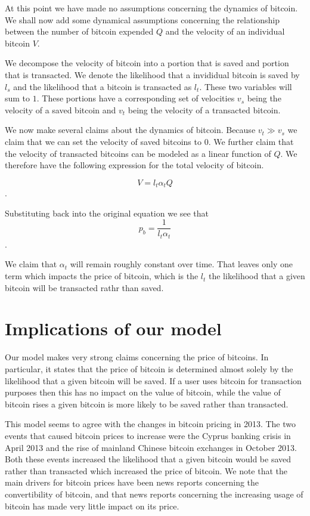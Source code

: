 \documentclass[twoside]{article}
\begin{document}
\begin{multicols}{2}
At this point we have made no assumptions concerning the dynamics of
bitcoin.  We shall now add some dynamical assumptions concerning the
relationship between the number of bitcoin expended $Q$ and the
velocity of an individual bitcoin $V$.

We decompose the velocity of bitcoin into a portion that is saved and
portion that is transacted.  We denote the likelihood that a
invididual bitcoin is saved by $l_s$ and the likelihood that a bitcoin
is transacted as $l_t$.  These two variables will sum to $1$.  These
portions have a corresponding set of velocities $v_s$ being the
velocity of a saved bitcoin and $v_t$ being the velocity of a
transacted bitcoin.

We now make several claims about the dynamics of bitcoin.  Because
$v_t \gg v_s$ we claim that we can set the velocity of saved bitcoins
to $0$.  We further claim that the velocity of transacted bitcoins can
be modeled as a linear function of $Q$.  We therefore have the
following expression for the total velocity of bitcoin.

\begin{equation}
V = l_t\alpha_t Q
\end{equation}.

Substituting back into the original equation we see that
\begin{equation}
p_b = \frac{1}{l_t \alpha_t}
\end{equation}.

We claim that $\alpha_t$ will remain roughly constant over time.  That
leaves only one term which impacts the price of bitcoin, which is the
$l_t$ the likelihood that a given bitcoin will be transacted rathr
than saved.

\section{Implications of our model}
Our model makes very strong claims concerning the price of bitcoins.
In particular, it states that the price of bitcoin is determined
almost solely by the likelihood that a given bitcoin will be saved. If
a user uses bitcoin for transaction purposes then this has no impact
on the value of bitcoin, while the value of bitcoin rises a given
bitcoin is more likely to be saved rather than transacted.

This model seems to agree with the changes in bitcoin pricing in 2013.
The two events that caused bitcoin prices to increase were the Cyprus
banking crisis in April 2013 and the rise of mainland Chinese bitcoin
exchanges in October 2013.  Both these events increased the likelihood
that a given bitcoin would be saved rather than transacted which
increased the price of bitcoin.  We note that the main drivers for
bitcoin prices have been news reports concerning the convertibility of
bitcoin, and that news reports concerning the increasing usage of
bitcoin has made very little impact on its price.


\end{multicols}
\end{document}
